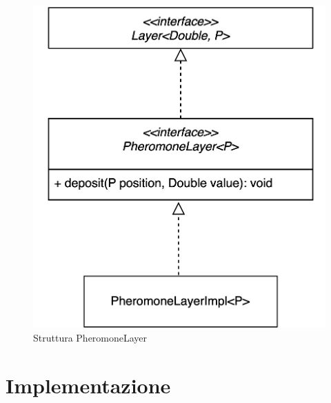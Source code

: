 \documentclass[12pt,a4paper,openright,twoside]{book}
\begin{document}
\begin{figure}[h!]
    \centering
    \includegraphics[width=.8\linewidth]{figures/pheromoneLayer.jpeg}
    \caption{Struttura PheromoneLayer}
    \label{fig:phLayer}
\end{figure}

%

\chapter{Implementazione}



\backmatter

\nocite{*} %



\end{document}

